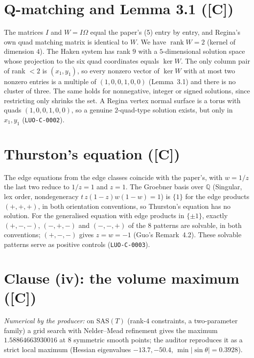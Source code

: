 \documentclass[10pt]{article}
\newcommand{\tier}[1]{\textsf{[#1]}}
\newcommand{\tC}{\tier{C}}
\begin{document}
\section{Q-matching and Lemma 3.1 (\tC{})}\label{sec:q}
The matrices $I$ and $W=I\Omega$ equal the paper's (5) entry by entry, and Regina's own quad matching matrix is identical to $W$. We have $\operatorname{rank}W=2$ (kernel of dimension $4$). The Haken system has rank $9$ with a $5$-dimensional solution space whose projection to the six quad coordinates equals $\ker W$. The only column pair of rank $<2$ is $(x_1,y_1)$, so every nonzero vector of $\ker W$ with at most two nonzero entries is a multiple of $(1,0,0,1,0,0)$ (Lemma~3.1) and there is no cluster of three. The same holds for nonnegative, integer or signed solutions, since restricting only shrinks the set. A Regina vertex normal surface is a torus with quads $(1,0,0,1,0,0)$, so a genuine $2$-quad-type solution exists, but only in $x_1,y_1$ (\texttt{LUO-C-0002}).

\section{Thurston's equation (\tC{})}\label{sec:thurston}
The edge equations from the edge classes coincide with the paper's, with $w=1/z$ the last two reduce to $1/z=1$ and $z=1$. The Groebner basis over $\mathbb Q$ (Singular, lex order, nondegeneracy $t\,z(1-z)w(1-w)=1$) is $\{1\}$ for the edge products $(+,+,+)$, in both orientation conventions, so Thurston's equation has no solution. For the generalised equation with edge products in $\{\pm1\}$, exactly $(+,-,-)$, $(-,+,-)$ and $(-,-,+)$ of the $8$ patterns are solvable, in both conventions; $(+,-,-)$ gives $z=w=-1$ (Guo's Remark~4.2). These solvable patterns serve as positive controls (\texttt{LUO-C-0003}).

\section{Clause (iv): the volume maximum (\tC{})}\label{sec:vol}
\emph{Numerical by the producer:} on $\mathrm{SAS}(T)$ (rank-$4$ constraints, a two-parameter family) a grid search with Nelder--Mead refinement gives the maximum $1.58864663930016$ at $8$ symmetric smooth points; the auditor reproduces it as a strict local maximum (Hessian eigenvalues $-13.7,-50.4$, $\min|\sin\theta|=0.3928$).
\end{document}
